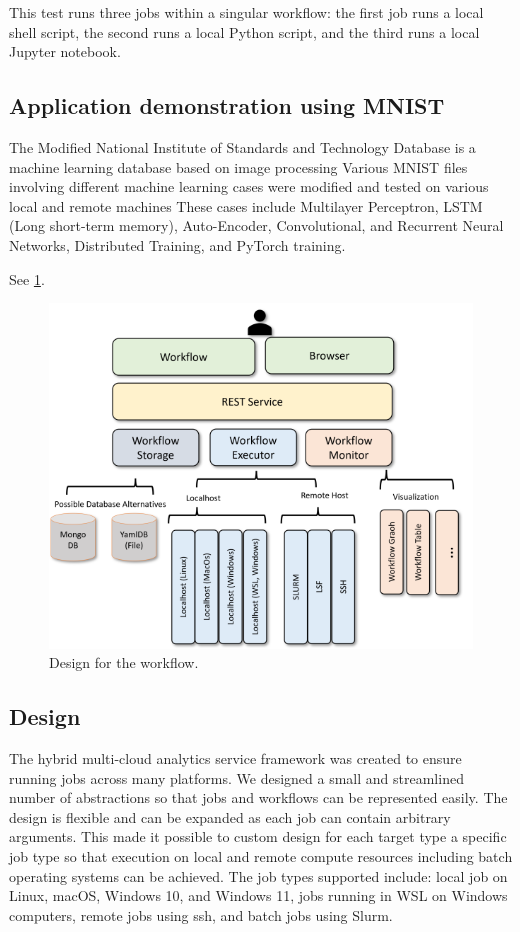 This test runs three jobs within a singular workflow: the first job runs
a local shell script, the second runs a local Python script, and the
third runs a local Jupyter notebook.

\subsection{Application demonstration using
MNIST}\label{application-demonstration-using-mnist}

The Modified National Institute of Standards and Technology Database is
a machine learning database based on image processing Various MNIST
files involving different machine learning cases were modified and
tested on various local and remote machines These cases include
Multilayer Perceptron, LSTM (Long short-term memory), Auto-Encoder,
Convolutional, and Recurrent Neural Networks, Distributed Training, and
PyTorch training.

See \ref{fig:workflow-uml}.

\begin{figure}
\centering
\includegraphics[width=1.0\columnwidth]{images/workflow-uml.png}
\caption{Design for the workflow.}\label{fig:workflow-uml}
\end{figure}

\subsection{Design}\label{design}

The hybrid multi-cloud analytics service framework was created to ensure
running jobs across many platforms. We designed a small and streamlined
number of abstractions so that jobs and workflows can be represented
easily. The design is flexible and can be expanded as each job can
contain arbitrary arguments. This made it possible to custom design for
each target type a specific job type so that execution on local and
remote compute resources including batch operating systems can be
achieved. The job types supported include: local job on Linux, macOS,
Windows 10, and Windows 11, jobs running in WSL on Windows computers,
remote jobs using ssh, and batch jobs using Slurm.

